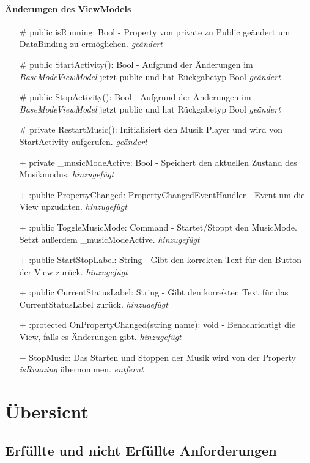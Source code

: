 \documentclass[a4paper,12pt]{article}
\begin{document}
\paragraph{Änderungen des ViewModels}
\begin{itemize}
	\item[\#]public isRunning: Bool - Property von private zu Public geändert um DataBinding zu ermöglichen. \textit{geändert}
	\item[\#]public StartActivity(): Bool - Aufgrund der Änderungen im \textit{BaseModeViewModel} jetzt public und hat Rückgabetyp Bool \textit{geändert}
	\item[\#]public StopActivity(): Bool - Aufgrund der Änderungen im \textit{BaseModeViewModel} jetzt public und hat Rückgabetyp Bool \textit{geändert}
	\item[\#]private RestartMusic(): Initialisiert den Musik Player und wird von StartActivity aufgerufen. \textit{geändert}
	\item[+]private \_musicModeActive: Bool - Speichert den aktuellen Zustand des Musikmodus. \textit{hinzugefügt}
	\item[+]:public PropertyChanged: PropertyChangedEventHandler - Event um die View upzudaten. \textit{hinzugefügt}
	\item[+]:public ToggleMusicMode: Command - Startet/Stoppt den MusicMode. Setzt außerdem \_musicModeActive. \textit{hinzugefügt}
	\item[+]:public StartStopLabel: String - Gibt den korrekten Text für den Button der View zurück. \textit{hinzugefügt}
	\item[+]:public CurrentStatusLabel: String - Gibt den korrekten Text für das CurrentStatusLabel zurück. \textit{hinzugefügt}
	\item[+]:protected OnPropertyChanged(string name): void - Benachrichtigt die View, falls es Änderungen gibt. \textit{hinzugefügt}
	\item[$-$]StopMusic: Das Starten und Stoppen der Musik wird von der Property \textit{isRunning} übernommen. \textit{entfernt}
\end{itemize}


\section{Übersicnt}
\subsection{Erfüllte und nicht Erfüllte Anforderungen}
\end{document}
